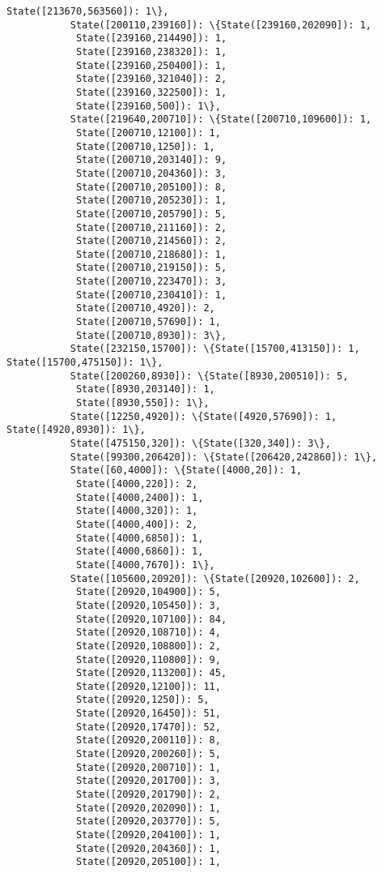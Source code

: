\documentclass[11pt]{article}
\begin{document}
\begin{Verbatim}[commandchars=\\\{\}]
            State([213670,563560]): 1\},
           State([200110,239160]): \{State([239160,202090]): 1,
            State([239160,214490]): 1,
            State([239160,238320]): 1,
            State([239160,250400]): 1,
            State([239160,321040]): 2,
            State([239160,322500]): 1,
            State([239160,500]): 1\},
           State([219640,200710]): \{State([200710,109600]): 1,
            State([200710,12100]): 1,
            State([200710,1250]): 1,
            State([200710,203140]): 9,
            State([200710,204360]): 3,
            State([200710,205100]): 8,
            State([200710,205230]): 1,
            State([200710,205790]): 5,
            State([200710,211160]): 2,
            State([200710,214560]): 2,
            State([200710,218680]): 1,
            State([200710,219150]): 5,
            State([200710,223470]): 3,
            State([200710,230410]): 1,
            State([200710,4920]): 2,
            State([200710,57690]): 1,
            State([200710,8930]): 3\},
           State([232150,15700]): \{State([15700,413150]): 1, State([15700,475150]): 1\},
           State([200260,8930]): \{State([8930,200510]): 5,
            State([8930,203140]): 1,
            State([8930,550]): 1\},
           State([12250,4920]): \{State([4920,57690]): 1, State([4920,8930]): 1\},
           State([475150,320]): \{State([320,340]): 3\},
           State([99300,206420]): \{State([206420,242860]): 1\},
           State([60,4000]): \{State([4000,20]): 1,
            State([4000,220]): 2,
            State([4000,2400]): 1,
            State([4000,320]): 1,
            State([4000,400]): 2,
            State([4000,6850]): 1,
            State([4000,6860]): 1,
            State([4000,7670]): 1\},
           State([105600,20920]): \{State([20920,102600]): 2,
            State([20920,104900]): 5,
            State([20920,105450]): 3,
            State([20920,107100]): 84,
            State([20920,108710]): 4,
            State([20920,108800]): 2,
            State([20920,110800]): 9,
            State([20920,113200]): 45,
            State([20920,12100]): 11,
            State([20920,1250]): 5,
            State([20920,16450]): 51,
            State([20920,17470]): 52,
            State([20920,200110]): 8,
            State([20920,200260]): 5,
            State([20920,200710]): 1,
            State([20920,201700]): 3,
            State([20920,201790]): 2,
            State([20920,202090]): 1,
            State([20920,203770]): 5,
            State([20920,204100]): 1,
            State([20920,204360]): 1,
            State([20920,205100]): 1,

\end{Verbatim}
\end{document}
